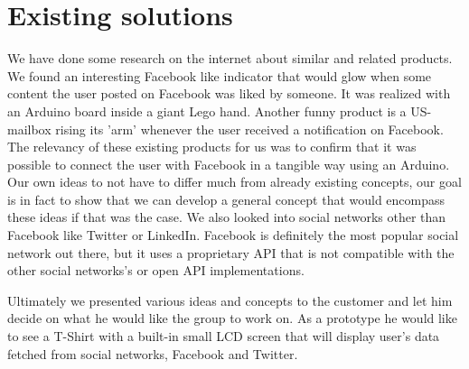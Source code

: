 \section{Existing solutions}

We have done some research on the internet about similar and related products. We found an interesting
Facebook like indicator that would glow when some content the user posted on Facebook was liked by someone.
It was realized with an Arduino board inside a giant Lego hand. Another funny product is a US-mailbox rising
its 'arm'  whenever the user received a notification on Facebook. The relevancy of these existing products
for us was to confirm that it was possible to connect the user with Facebook in a tangible way using an Arduino.
Our own ideas to not have to differ much from already existing concepts, our goal is in fact to show that we can
develop a general concept that would encompass these ideas if that was the case. We also looked into social
networks other than Facebook like Twitter or LinkedIn. Facebook is definitely the most popular social network
out there, but it uses a proprietary API that is not compatible with the other social networks's or open
API implementations.

Ultimately we presented various ideas and concepts to the customer and let him decide on what he would
like the group to work on. As a prototype he would like to see a T-Shirt with a built-in small LCD screen
that will display user's data fetched from social networks, Facebook and Twitter.